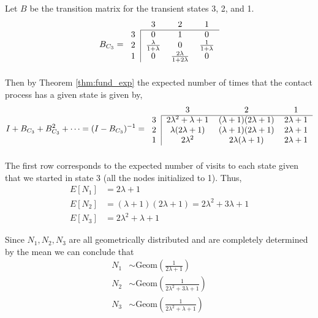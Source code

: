 Let $B$ be the transition matrix for the transient states 3, 2, and 1.
$$
B_{C_3} = \begin{blockarray}{cccc}
    & 3 & 2 & 1\\
    \begin{block}{c|ccc}
    \cline{2-4}
        3 & 0 & 1 & 0\\
        2 & \frac{\lambda}{1 + \lambda} & 0 &
        \frac{1}{1 + \lambda}\\
        1 & 0 & \frac{2\lambda}{1 + 2 \lambda} & 0\\
    \end{block}
    \end{blockarray}
$$
Then by Theorem \ref{thm:fund_exp} the expected number of times that the contact process has a given state is given by,
$$
    I + B_{C_3} + B_{C_3}^2 + \cdots = (I - B_{C_3})^{-1} = \begin{blockarray}{cccc}
    & 3 & 2 & 1\\
    \begin{block}{c|ccc}
    \cline{2-4}
    3 & 2 \lambda^2 + \lambda + 1 & (\lambda + 1) (2 \lambda + 1) &  2 \lambda + 1\\
    2 & \lambda (2 \lambda + 1) & (\lambda + 1)(2 \lambda + 1) & 2 \lambda + 1\\
    1 & 2 \lambda^2 & 2 \lambda ( \lambda + 1) &  2\lambda + 1\\
    \end{block}
    \end{blockarray}
$$
The first row corresponds to the expected number of visits to each state given that we started in state 3 (all the nodes initialized to 1).
Thus,
\begin{align*}
    E[N_1] &= 2 \lambda + 1\\
    E[N_2] &= (\lambda + 1) (2 \lambda + 1) = 2\lambda^2 + 3 \lambda + 1\\
    E[N_3] &=  2 \lambda^2 + \lambda + 1
\end{align*}

Since $N_1, N_2, N_3$ are all geometrically distributed and are completely determined by the mean we can conclude that
\begin{align*}
    N_1 &\sim  \text{Geom}\left(\frac{1}{2 \lambda + 1} \right)\\
    N_2 &\sim \text{Geom}\left(\frac{1}{2\lambda^2 + 3 \lambda + 1} \right)\\
    N_3 &\sim  \text{Geom}\left(\frac{1}{2 \lambda^2 + \lambda + 1}\right)
\end{align*}

